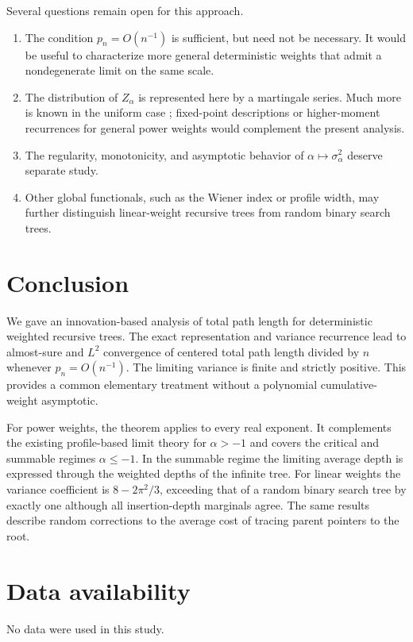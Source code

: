 \documentclass[11pt,a4paper]{article}
\newcommand{\1}{\mathbf{1}}
\begin{document}
Several questions remain open for this approach.
\begin{enumerate}[label=(\roman*)]
\item The condition $p_n=O(n^{-1})$ is sufficient, but need not be necessary.
It would be useful to characterize more general deterministic weights that admit a nondegenerate limit on the same scale.
\item The distribution of $Z_\alpha$ is represented here by a martingale series.
Much more is known in the uniform case \citep{Mahmoud1991,DobrowFill1999}; fixed-point descriptions or higher-moment recurrences for general power weights would complement the present analysis.
\item The regularity, monotonicity, and asymptotic behavior of $\alpha\mapsto\sigma_\alpha^2$ deserve separate study.
\item Other global functionals, such as the Wiener index or profile width, may further distinguish linear-weight recursive trees from random binary search trees.
\end{enumerate}

\section{Conclusion}\label{sec:conclusion}
We gave an innovation-based analysis of total path length for deterministic weighted recursive trees.
The exact representation and variance recurrence lead to almost-sure and $L^2$ convergence of centered total path length divided by $n$ whenever $p_n=O(n^{-1})$.
The limiting variance is finite and strictly positive.
This provides a common elementary treatment without a polynomial cumulative-weight asymptotic.

For power weights, the theorem applies to every real exponent.
It complements the existing profile-based limit theory for $\alpha>-1$ and covers the critical and summable regimes $\alpha\le-1$.
In the summable regime the limiting average depth is expressed through the weighted depths of the infinite tree.
For linear weights the variance coefficient is $8-2\pi^2/3$, exceeding that of a random binary search tree by exactly one although all insertion-depth marginals agree.
The same results describe random corrections to the average cost of tracing parent pointers to the root.

\section*{Data availability}
No data were used in this study.
\end{document}
